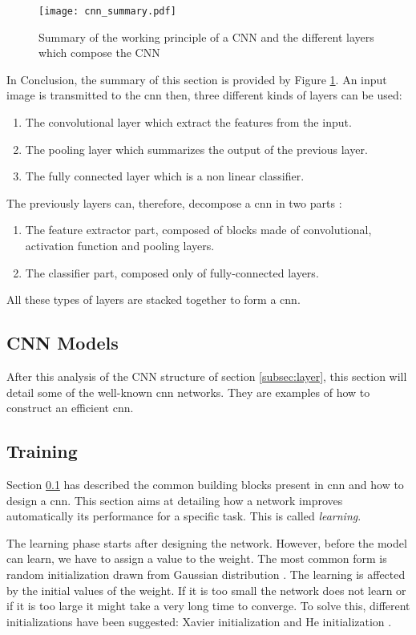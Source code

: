 \begin{figure}
    \centering
    \texttt{[image: cnn\_summary.pdf]}
    \caption{Summary of the working principle of a CNN and the different layers which compose the CNN}
    \label{fig:layer:summary}
\end{figure}
%
In Conclusion, the summary of this section is provided by Figure \ref{fig:layer:summary}. An input image is transmitted to the \acrshort{cnn} then, three different kinds of layers can be used:
%
\begin{enumerate}
    \item The convolutional layer which extract the features from the input.
    \item The pooling layer which summarizes the output of the previous layer.
    \item The fully connected layer which is a non linear classifier.
\end{enumerate}
%
The previously layers can, therefore, decompose a \acrshort{cnn} in two parts \cite{matteucci_artificial_2019}:
\begin{enumerate}
    \item The feature extractor part, composed of blocks made of convolutional, activation function and pooling layers.
    \item The classifier part, composed only of fully-connected layers.
\end{enumerate}
%
All these types of layers are stacked together to form a \acrshort{cnn}.
%
\subsection{CNN Models} \label{subsec:models}
After this analysis of the CNN structure of section \ref{subsec:layer}, this section will detail some of the well-known \acrshort{cnn} networks. They are examples of how to construct an efficient \acrshort{cnn}.

%

%
%
\subsection{Training} \label{subsec:train}
Section \ref{subsec:models} has described the common building blocks present in \acrshort{cnn} and how to design a \acrshort{cnn}. This section aims at detailing how a network improves automatically its performance for a specific task. This is called \textit{learning}.

The learning phase starts after designing the network. However, before the model can learn, we have to assign a value to the weight. The most common form is random initialization drawn from Gaussian distribution \cite{he_delving_2015}. The learning is affected by the initial values of the weight. If it is too small the network does not learn or if it is too large it might take a very long time to converge. To solve this, different initializations have been suggested: Xavier initialization \cite{glorot_understanding_2010} and He initialization \cite{he_delving_2015}.

